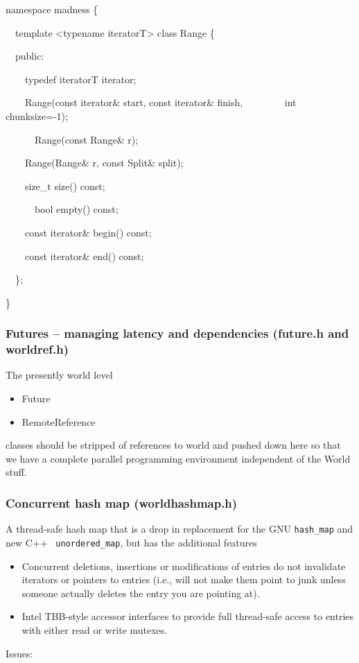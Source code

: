 \documentclass[letterpaper]{article}
\newcommand\liststyleLiii{%
\renewcommand\labelitemi{${\bullet}$}
\renewcommand\labelitemii{${\circ}$}
\renewcommand\labelitemiii{${\blacksquare}$}
\renewcommand\labelitemiv{${\bullet}$}
}
\newcommand\liststyleLiv{%
\renewcommand\labelitemi{${\bullet}$}
\renewcommand\labelitemii{${\circ}$}
\renewcommand\labelitemiii{${\blacksquare}$}
\renewcommand\labelitemiv{${\bullet}$}
}
\begin{document}
{\ttfamily
namespace madness \{}

{\ttfamily
\ \ template {\textless}typename iteratorT{\textgreater} class Range \{}

{\ttfamily
\ \ public:}

{\ttfamily
\ \ \ \ typedef iteratorT iterator;}

{\ttfamily
\ \ \ \ Range(const iterator\& start, const iterator\& finish, \newline
\ \ \ \ \ \ \ \ int chunksize=-1);}


\bigskip

{\ttfamily
\ \ \ \ \ \ Range(const Range\& r);}

{\ttfamily
\ \ \ \ Range(Range\& r, const Split\& split);}

{\ttfamily
\ \ \ \ size\_t size() const;}

{\ttfamily
\ \ \ \ \ \ bool empty() const;}

{\ttfamily
\ \ \ \ const iterator\& begin() const;}

{\ttfamily
\ \ \ \ const iterator\& end() const;}

{\ttfamily
\ \ \};}

{\ttfamily
\}}

\subsubsection[Futures {}-- managing latency and dependencies (future.h and worldref.h)]{Futures -- managing latency
and dependencies (future.h and worldref.h)}
The presently world level

\liststyleLiii
\begin{itemize}
\item {\ttfamily
Future}
\item {\ttfamily
RemoteReference}
\end{itemize}
classes should be stripped of references to world and pushed down here so that we have a complete parallel programming
environment independent of the World stuff.

\subsubsection{Concurrent hash map (worldhashmap.h)}
A thread-safe hash map that is a drop in replacement for the GNU \texttt{hash\_map} and new C++
\ \texttt{unordered\_map}, but has the additional features

\liststyleLiv
\begin{itemize}
\item Concurrent deletions, insertions or modifications of entries do not invalidate iterators or pointers to entries
(i.e., will not make them point to junk unless someone actually deletes the entry you are pointing at).
\item Intel TBB-style accessor interfaces to provide full thread-safe access to entries with either read or write
mutexes.
\end{itemize}
Issues:
\end{document}
